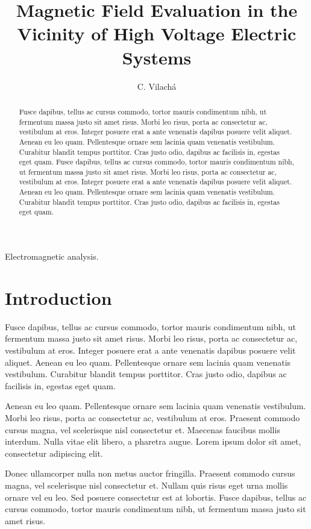 \documentclass[journal]{../template/IEEEtran}
\begin{document}
\title{Magnetic Field Evaluation in the Vicinity of High Voltage Electric Systems}
\author{C. Vilach\'a}


\maketitle

\begin{abstract}
Fusce dapibus, tellus ac cursus commodo, tortor mauris condimentum nibh, ut fermentum massa justo sit amet risus. Morbi leo risus, porta ac consectetur ac, vestibulum at eros. Integer posuere erat a ante venenatis dapibus posuere velit aliquet. Aenean eu leo quam. Pellentesque ornare sem lacinia quam venenatis vestibulum. Curabitur blandit tempus porttitor. Cras justo odio, dapibus ac facilisis in, egestas eget quam.
Fusce dapibus, tellus ac cursus commodo, tortor mauris condimentum nibh, ut fermentum massa justo sit amet risus. Morbi leo risus, porta ac consectetur ac, vestibulum at eros. Integer posuere erat a ante venenatis dapibus posuere velit aliquet. Aenean eu leo quam. Pellentesque ornare sem lacinia quam venenatis vestibulum. Curabitur blandit tempus porttitor. Cras justo odio, dapibus ac facilisis in, egestas eget quam.
\end{abstract}
\begin{IEEEkeywords}
Electromagnetic analysis.
\end{IEEEkeywords}

\section{Introduction}
 Fusce dapibus, tellus ac cursus commodo, tortor mauris condimentum nibh, ut fermentum massa justo sit amet risus. Morbi leo risus, porta ac consectetur ac, vestibulum at eros. Integer posuere erat a ante venenatis dapibus posuere velit aliquet. Aenean eu leo quam. Pellentesque ornare sem lacinia quam venenatis vestibulum. Curabitur blandit tempus porttitor. Cras justo odio, dapibus ac facilisis in, egestas eget quam.

Aenean eu leo quam. Pellentesque ornare sem lacinia quam venenatis vestibulum. Morbi leo risus, porta ac consectetur ac, vestibulum at eros. Praesent commodo cursus magna, vel scelerisque nisl consectetur et. Maecenas faucibus mollis interdum. Nulla vitae elit libero, a pharetra augue. Lorem ipsum dolor sit amet, consectetur adipiscing elit.

Donec ullamcorper nulla non metus auctor fringilla. Praesent commodo cursus magna, vel scelerisque nisl consectetur et. Nullam quis risus eget urna mollis ornare vel eu leo. Sed posuere consectetur est at lobortis. Fusce dapibus, tellus ac cursus commodo, tortor mauris condimentum nibh, ut fermentum massa justo sit amet risus.
\end{document}
